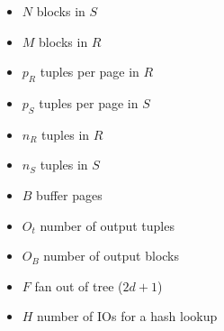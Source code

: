 \documentclass{article}
\begin{document}
\begin{itemize}
  \item $N$ blocks in $S$
  \item $M$ blocks in $R$
  \item $p_R$ tuples per page in $R$
  \item $p_S$ tuples per page in $S$
  \item $n_R$ tuples in $R$
  \item $n_S$ tuples in $S$
  \item $B$ buffer pages
  \item $O_t$ number of output tuples
  \item $O_B$ number of output blocks
  \item $F$ fan out of tree ($2d + 1$)
  \item $H$ number of IOs for a hash lookup
\end{itemize}
\end{document}
